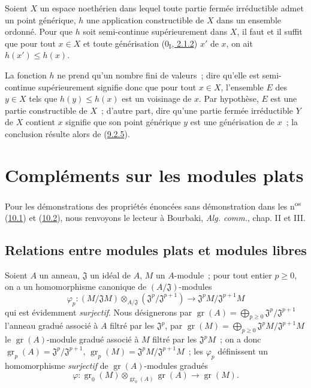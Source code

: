 \begin{proposition}[9.3.4]
\label{0.9.3.4-fr}
Soient $X$ un espace noethérien dans lequel toute partie fermée irréductible
admet un point générique, $h$ une application constructible de $X$ dans un
ensemble ordonné. Pour que $h$ soit semi-continue supérieurement dans $X$,
il faut et il suffit que pour tout $x\in X$ et toute générisation
(\hyperref[0.2.1.2-fr]{$0_{\mathrm I}$, 2.1.2}) $x'$ de $x$, on ait
$h(x')\leq h(x)$.
\end{proposition}

La fonction $h$ ne prend qu'un nombre fini de valeurs~; dire qu'elle est
semi-continue supérieurement signifie donc que pour tout $x\in X$,
l'ensemble $E$ des $y\in X$ tels que $h(y)\leq h(x)$ est un voisinage de $x$.
Par hypothèse, $E$ est une partie constructible de $X$~; d'autre part, dire
qu'une partie fermée irréductible $Y$ de $X$ contient $x$ signifie que son
point générique $y$ est une générisation de $x$~; la conclusion résulte
alors de (\hyperref[0.9.2.5-fr]{9.2.5}).

\section{Compléments sur les modules plats}
\label{section:0.10-fr}

Pour les démonstrations des propriétés énoncées sans démonstration dans les
n\textsuperscript{os} (\hyperref[subsection:0.10.1-fr]{10.1}) et
(\hyperref[subsection:0.10.2-fr]{10.2}), nous renvoyons le lecteur à Bourbaki,
\emph{Alg. comm.}, chap. II et III.

\subsection{Relations entre modules plats et modules libres}
\label{subsection:0.10.1-fr}

\begin{env}[10.1.1]
\label{0.10.1.1-fr}
Soient $A$ un anneau, $\mathfrak{J}$ un idéal de $A$, $M$ un $A$-module~; pour
tout entier $p\geq0$, on a un homomorphisme canonique de
$(A/\mathfrak{J})$-modules
\[
\label{0.10.1.1.1-fr}
  \varphi_p:(M/\mathfrak{J}M)\otimes_{A/\mathfrak{J}}
  (\mathfrak{J}^p/\mathfrak{J}^{p+1})
  \longrightarrow \mathfrak{J}^pM/\mathfrak{J}^{p+1}M
  \tag{10.1.1.1}
\]
qui est évidemment \emph{surjectif}. Nous désignerons par
$\operatorname{gr}(A)=\bigoplus_{p\geq0}\mathfrak{J}^p/\mathfrak{J}^{p+1}$ l'anneau gradué
associé à $A$ filtré par les $\mathfrak{J}^p$, par
$\operatorname{gr}(M)=\bigoplus_{p\geq0}\mathfrak{J}^pM/\mathfrak{J}^{p+1}M$ le
$\operatorname{gr}(A)$-module gradué associé à $M$ filtré par les $\mathfrak{J}^pM$~; on a
donc $\operatorname{gr}_p(A)=\mathfrak{J}^p/\mathfrak{J}^{p+1}$,
$\operatorname{gr}_p(M)=\mathfrak{J}^pM/\mathfrak{J}^{p+1}M$~; les $\varphi_p$ définissent
un homomorphisme \emph{surjectif} de $\operatorname{gr}(A)$-modules gradués
\[
\label{0.10.1.1.2-fr}
  \varphi:\operatorname{gr}_0(M)\otimes_{\operatorname{gr}_0(A)}
  \operatorname{gr}(A)\longrightarrow\operatorname{gr}(M).
  \tag{10.1.1.2}
\]
\end{env}

